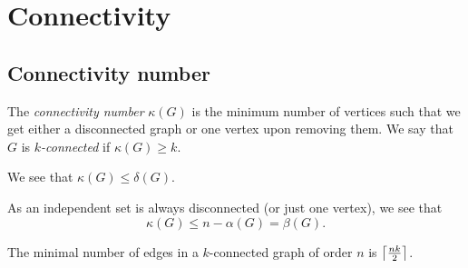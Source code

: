 \section{Connectivity}

\subsection{Connectivity number}

\begin{definicija}
The \emph{connectivity number}
$\kappa(G)$ is the minimum number of vertices such that we get
either a disconnected graph or one vertex upon removing them. We
say that $G$ is \emph{$k$-connected} if
$\kappa(G) \geq k$.
\end{definicija}

\begin{opomba}
We see that $\kappa(G) \leq \delta(G)$.
\end{opomba}

\begin{opomba}
As an independent set is always disconnected (or just one vertex),
we see that
\[
\kappa(G) \leq n - \alpha(G) = \beta(G).
\]
\end{opomba}

\begin{izrek}
The minimal number of edges in a $k$-connected graph of order $n$
is $\left\lceil \frac{nk}{2}\right\rceil$.
\end{izrek}

